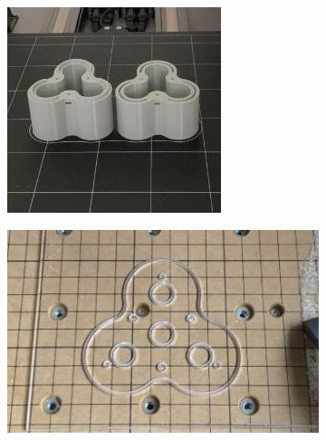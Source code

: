 \documentclass[twoside]{article}
\begin{document}
\begin{figure}[H]
	\begin{subfigure}[b]{0.33\linewidth}
		\centering
		\includegraphics[width=\textwidth]{top_bottom_printed}
	\end{subfigure}%
	\begin{subfigure}[b]{0.33\linewidth}
		\centering		
		\includegraphics[width=\textwidth]{cover_plate_cnc}
	\end{subfigure}%
	\begin{subfigure}[b]{0.33\linewidth}
		\centering

\end{subfigure}
\end{figure}
\end{document}
